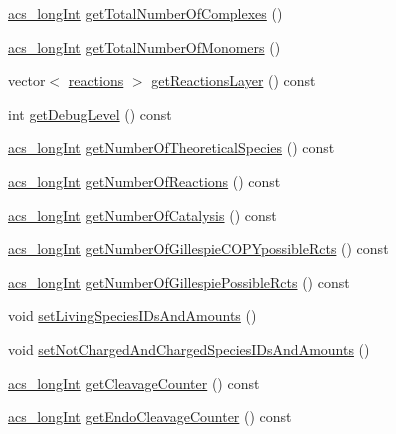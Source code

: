 \begin{DoxyCompactItemize}
\hyperlink{acs__headers_8h_a19319d75f02db4308bc5c0026d98cd85}{acs\-\_\-long\-Int} \hyperlink{classenvironment_ab564c7ddffd3dba896d5b049e1257793}{get\-Total\-Number\-Of\-Complexes} ()
\item 
\hyperlink{acs__headers_8h_a19319d75f02db4308bc5c0026d98cd85}{acs\-\_\-long\-Int} \hyperlink{classenvironment_aa8c94019533639038f99587fc2b029dc}{get\-Total\-Number\-Of\-Monomers} ()
\item 
vector$<$ \hyperlink{classreactions}{reactions} $>$ \hyperlink{classenvironment_a3d44f3f4a8f9010fa99c49f5cc961416}{get\-Reactions\-Layer} () const 
\item 
int \hyperlink{classenvironment_a2de42381b0b9cba889bbb95c1456cfe5}{get\-Debug\-Level} () const 
\item 
\hyperlink{acs__headers_8h_a19319d75f02db4308bc5c0026d98cd85}{acs\-\_\-long\-Int} \hyperlink{classenvironment_ab98d4ad28b101f08279aa3458d5dfda3}{get\-Number\-Of\-Theoretical\-Species} () const 
\item 
\hyperlink{acs__headers_8h_a19319d75f02db4308bc5c0026d98cd85}{acs\-\_\-long\-Int} \hyperlink{classenvironment_abf45b6406f8c0e95c4c5edf6b374e112}{get\-Number\-Of\-Reactions} () const 
\item 
\hyperlink{acs__headers_8h_a19319d75f02db4308bc5c0026d98cd85}{acs\-\_\-long\-Int} \hyperlink{classenvironment_a21609adb1a83a4cb7eaec78a90acd624}{get\-Number\-Of\-Catalysis} () const 
\item 
\hyperlink{acs__headers_8h_a19319d75f02db4308bc5c0026d98cd85}{acs\-\_\-long\-Int} \hyperlink{classenvironment_a79255c58733b08407dc81d89e306d74f}{get\-Number\-Of\-Gillespie\-C\-O\-P\-Ypossible\-Rcts} () const 
\item 
\hyperlink{acs__headers_8h_a19319d75f02db4308bc5c0026d98cd85}{acs\-\_\-long\-Int} \hyperlink{classenvironment_a3140242018e8232dfa89a127ac1bb282}{get\-Number\-Of\-Gillespie\-Possible\-Rcts} () const 
\item 
void \hyperlink{classenvironment_a4fb98d7cad06ef479e2643785231feb9}{set\-Living\-Species\-I\-Ds\-And\-Amounts} ()
\item 
void \hyperlink{classenvironment_ac5528a39937cdc76f0dd23c27542110c}{set\-Not\-Charged\-And\-Charged\-Species\-I\-Ds\-And\-Amounts} ()
\item 
\hyperlink{acs__headers_8h_a19319d75f02db4308bc5c0026d98cd85}{acs\-\_\-long\-Int} \hyperlink{classenvironment_a8b9a3b5c5a2f86206c5fb124352e366e}{get\-Cleavage\-Counter} () const 
\item 
\hyperlink{acs__headers_8h_a19319d75f02db4308bc5c0026d98cd85}{acs\-\_\-long\-Int} \hyperlink{classenvironment_aa2ded3c5ba8c4ce41ee86399dc616d4a}{get\-Endo\-Cleavage\-Counter} () const 

\end{DoxyCompactItemize}
